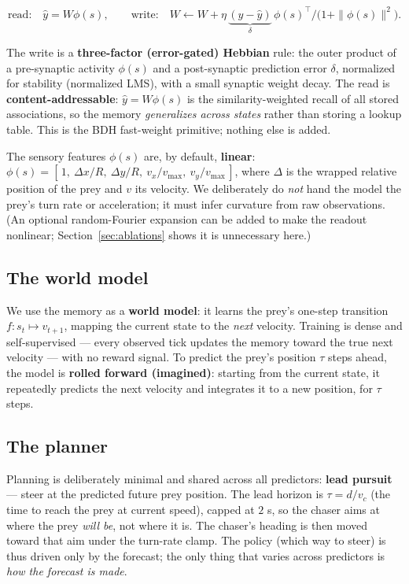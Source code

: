 \documentclass[11pt]{article}
\begin{document}
\begin{equation}
\text{read:}\quad \hat{y} = W \phi(s), \qquad
\text{write:}\quad W \leftarrow W + \eta\,\underbrace{(y - \hat{y})}_{\delta}\,\phi(s)^{\top}
\Big/ \big(1 + \|\phi(s)\|^2\big).
\end{equation}

The write is a \textbf{three-factor (error-gated) Hebbian} rule: the outer product of a
pre-synaptic activity $\phi(s)$ and a post-synaptic prediction error $\delta$, normalized for
stability (normalized LMS), with a small synaptic weight decay. The read is
\textbf{content-addressable}: $\hat y = W\phi(s)$ is the similarity-weighted recall of all
stored associations, so the memory \emph{generalizes across states} rather than storing a
lookup table. This is the BDH fast-weight primitive; nothing else is added.

The sensory features $\phi(s)$ are, by default, \textbf{linear}:
$\phi(s) = [\,1,\ \Delta x/R,\ \Delta y/R,\ v_x/v_{\max},\ v_y/v_{\max}\,]$, where $\Delta$ is
the wrapped relative position of the prey and $v$ its velocity. We deliberately do \emph{not}
hand the model the prey's turn rate or acceleration; it must infer curvature from raw
observations. (An optional random-Fourier expansion can be added to make the readout nonlinear;
Section~\ref{sec:ablations} shows it is unnecessary here.)

\subsection{The world model}

We use the memory as a \textbf{world model}: it learns the prey's one-step transition
$f: s_t \mapsto v_{t+1}$, mapping the current state to the \emph{next} velocity. Training is
dense and self-supervised --- every observed tick updates the memory toward the true next
velocity --- with no reward signal. To predict the prey's position $\tau$ steps ahead, the model
is \textbf{rolled forward (imagined)}: starting from the current state, it repeatedly predicts
the next velocity and integrates it to a new position, for $\tau$ steps.

\subsection{The planner}

Planning is deliberately minimal and shared across all predictors: \textbf{lead pursuit} ---
steer at the predicted future prey position. The lead horizon is $\tau = d / v_c$ (the time to
reach the prey at current speed), capped at $2$ s, so the chaser aims at where the prey
\emph{will be}, not where it is. The chaser's heading is then moved toward that aim under the
turn-rate clamp. The policy (which way to steer) is thus driven only by the forecast; the only
thing that varies across predictors is \emph{how the forecast is made}.
\end{document}

